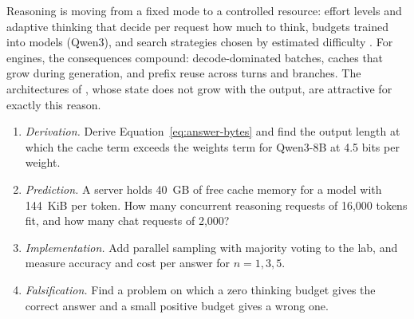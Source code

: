 
Reasoning is moving from a fixed mode to a controlled resource: effort levels
and adaptive thinking that decide per request how much to think, budgets
trained into models (Qwen3), and search strategies chosen by estimated
difficulty \cite{snell2024testtime}. For engines, the consequences compound:
decode-dominated batches, caches that grow during generation, and prefix
reuse across turns and branches. The architectures of ,
whose state does not grow with the output, are attractive for exactly this
reason.

\ExercisesSection

\begin{enumerate}
\item \emph{Derivation.} Derive Equation~\ref{eq:answer-bytes} and find the
  output length at which the cache term exceeds the weights term for Qwen3-8B
  at 4.5 bits per weight.
\item \emph{Prediction.} A server holds 40~GB of free cache memory for a model
  with 144~KiB per token. How many concurrent reasoning requests of 16,000
  tokens fit, and how many chat requests of 2,000?
\item \emph{Implementation.} Add parallel sampling with majority voting to the
  lab, and measure accuracy and cost per answer for $n = 1, 3, 5$.
\item \emph{Falsification.} Find a problem on which a zero thinking budget
  gives the correct answer and a small positive budget gives a wrong one.
\end{enumerate}
